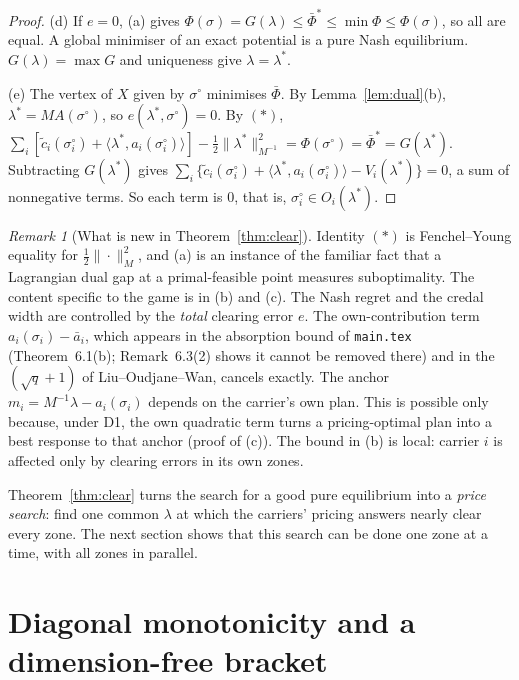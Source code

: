 \documentclass[11pt]{article}
\theoremstyle{definition}
\theoremstyle{remark}
\newtheorem{remark}[theorem]{Remark}
\newcommand{\ip}[2]{\langle #1,#2\rangle}
\begin{document}
\begin{proof}
(d) If $e=0$, (a) gives $\Phi(\sigma)=G(\lambda)\le\bar\Phi^*\le\min\Phi\le\Phi(\sigma)$, so all are equal. A global minimiser of an exact potential is a pure Nash equilibrium. $G(\lambda)=\max G$ and uniqueness give $\lambda=\lambda^*$.

(e) The vertex of $X$ given by $\sigma^\circ$ minimises $\bar\Phi$. By Lemma~\ref{lem:dual}(b), $\lambda^*=MA(\sigma^\circ)$, so $e(\lambda^*,\sigma^\circ)=0$. By $(\ast)$, $\sum_i[\tilde c_i(\sigma^\circ_i)+\ip{\lambda^*}{a_i(\sigma^\circ_i)}]-\tfrac12\|\lambda^*\|^2_{M^{-1}}=\Phi(\sigma^\circ)=\bar\Phi^*=G(\lambda^*)$. Subtracting $G(\lambda^*)$ gives $\sum_i\{\tilde c_i(\sigma^\circ_i)+\ip{\lambda^*}{a_i(\sigma^\circ_i)}-V_i(\lambda^*)\}=0$, a sum of nonnegative terms. So each term is $0$, that is, $\sigma^\circ_i\in O_i(\lambda^*)$.
\end{proof}

\begin{remark}[What is new in Theorem~\ref{thm:clear}]\label{rem:own}
Identity $(\ast)$ is Fenchel--Young equality for $\tfrac12\|\cdot\|^2_M$, and (a) is an instance of the familiar fact that a Lagrangian dual gap at a primal-feasible point measures suboptimality. The content specific to the game is in (b) and (c). The Nash regret and the credal width are controlled by the \emph{total} clearing error $e$. The own-contribution term $a_i(\sigma_i)-\bar a_i$, which appears in the absorption bound of \texttt{main.tex} (Theorem~6.1(b); Remark~6.3(2) shows it cannot be removed there) and in the $(\sqrt q+1)$ of Liu--Oudjane--Wan, cancels exactly. The anchor $m_i=M^{-1}\lambda-a_i(\sigma_i)$ depends on the carrier's own plan. This is possible only because, under D1, the own quadratic term turns a pricing-optimal plan into a best response to that anchor (proof of (c)). The bound in (b) is local: carrier $i$ is affected only by clearing errors in its own zones.
\end{remark}

Theorem~\ref{thm:clear} turns the search for a good pure equilibrium into a \emph{price search}: find one common $\lambda$ at which the carriers' pricing answers nearly clear every zone. The next section shows that this search can be done one zone at a time, with all zones in parallel.

\section{Diagonal monotonicity and a dimension-free bracket}\label{sec:bracket}
\end{document}
